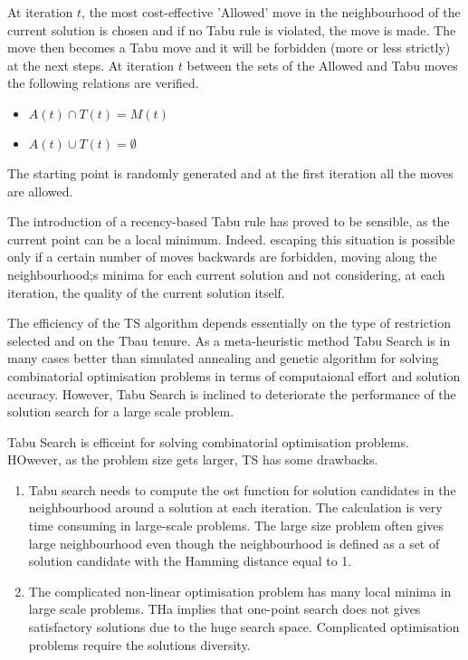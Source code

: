 At iteration $t$, the most cost-effective 'Allowed' move in the neighbourhood of the current solution is chosen and if no Tabu rule is violated, the move is made. The move then becomes a Tabu move and it will be forbidden (more or less strictly) at the next steps. At iteration $t$ between the sets of the Allowed and Tabu moves the following relations are verified.
\begin{itemize}
\item $A(t) \cap T(t) = M(t)$
\item $A(t) \cup T(t) = \emptyset$
\end{itemize}

The starting point is randomly generated and at the first iteration all the moves are allowed.

The introduction of a recency-based Tabu rule has proved to be sensible, as the current point can be a local minimum. Indeed. escaping this situation is possible only if a certain number of moves backwards are forbidden, moving along the neighbourhood;s minima for each current solution and not considering, at each iteration, the quality of the current solution itself.

The efficiency of the TS algorithm depends essentially on the type of restriction selected and on the Tbau tenure. As a meta-heuristic method Tabu Search is in many cases better than simulated annealing and genetic algorithm for solving combinatorial optimisation problems in terms of computaional effort and solution accuracy. However, Tabu Search is inclined to deteriorate the performance of the solution search for a large scale problem.

Tabu Search is efficeint for solving combinatorial optimisation problems. HOwever, as the problem size gets larger, TS has some drawbacks.

\begin{enumerate}
\item Tabu search needs to compute the ost function for solution candidates in the neighbourhood around a solution at each iteration. The calculation is very time consuming in large-scale problems. The large size problem often gives large neighbourhood even though the neighbourhood is defined as a set of solution candidate with the Hamming distance equal to 1.
\item The complicated non-linear optimisation problem has many local minima in large scale problems. THa implies that one-point search does not gives satisfactory solutions due to the huge search space. Complicated optimisation problems require the solutions diversity.
\end{enumerate}

